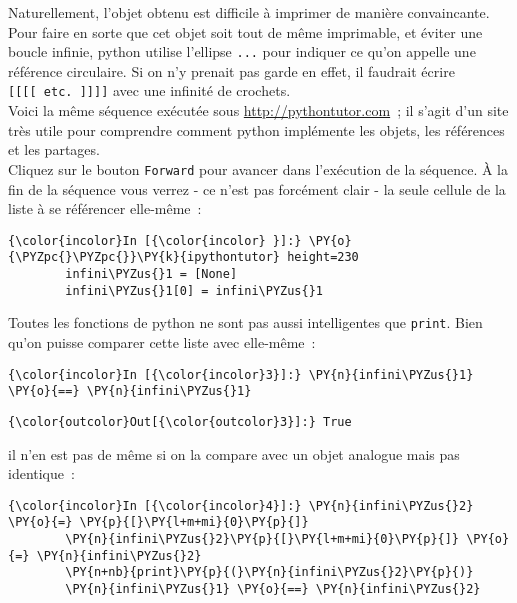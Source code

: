 Naturellement, l'objet obtenu est difficile à imprimer de manière
convaincante. Pour faire en sorte que cet objet soit tout de même
imprimable, et éviter une boucle infinie, python utilise l'ellipse
\texttt{...} pour indiquer ce qu'on appelle une référence circulaire. Si
on n'y prenait pas garde en effet, il faudrait écrire
\texttt{{[}{[}{[}{[}\ etc.\ {]}{]}{]}{]}} avec une infinité de crochets.\\

    Voici la même séquence exécutée sous \href{http://pythontutor.com}{http://pythontutor.com}~; il s'agit
d'un site très utile pour comprendre comment python implémente les
objets, les références et les partages.\\

Cliquez sur le bouton \texttt{Forward} pour avancer dans l'exécution de
la séquence. À la fin de la séquence vous verrez - ce n'est pas
forcément clair - la seule cellule de la liste à se référencer
elle-même~:

    \begin{Verbatim}[commandchars=\\\{\}]
{\color{incolor}In [{\color{incolor} }]:} \PY{o}{\PYZpc{}\PYZpc{}}\PY{k}{ipythontutor} height=230
        infini\PYZus{}1 = [None]
        infini\PYZus{}1[0] = infini\PYZus{}1
\end{Verbatim}


    Toutes les fonctions de python ne sont pas aussi intelligentes que
\texttt{print}. Bien qu'on puisse comparer cette liste avec elle-même~:

    \begin{Verbatim}[commandchars=\\\{\}]
{\color{incolor}In [{\color{incolor}3}]:} \PY{n}{infini\PYZus{}1} \PY{o}{==} \PY{n}{infini\PYZus{}1}
\end{Verbatim}


\begin{Verbatim}[commandchars=\\\{\}]
{\color{outcolor}Out[{\color{outcolor}3}]:} True
\end{Verbatim}
            
    il n'en est pas de même si on la compare avec un objet analogue mais pas
identique~:

    \begin{Verbatim}[commandchars=\\\{\}]
{\color{incolor}In [{\color{incolor}4}]:} \PY{n}{infini\PYZus{}2} \PY{o}{=} \PY{p}{[}\PY{l+m+mi}{0}\PY{p}{]}
        \PY{n}{infini\PYZus{}2}\PY{p}{[}\PY{l+m+mi}{0}\PY{p}{]} \PY{o}{=} \PY{n}{infini\PYZus{}2}
        \PY{n+nb}{print}\PY{p}{(}\PY{n}{infini\PYZus{}2}\PY{p}{)}
        \PY{n}{infini\PYZus{}1} \PY{o}{==} \PY{n}{infini\PYZus{}2}
\end{Verbatim}


